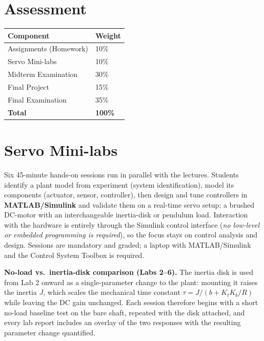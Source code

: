 \documentclass[11pt]{article}
\begin{document}
\section{Assessment}
\begin{center}
\begin{tabular}{@{}L{9cm} C{2cm}@{}}
\toprule
\textbf{Component} & \textbf{Weight} \\
\midrule
Assignments (Homework)      & 10\% \\
Servo Mini-labs             & 10\% \\
Midterm Examination         & 30\% \\
Final Project               & 15\% \\
Final Examination           & 35\% \\
\midrule
\textbf{Total}              & \textbf{100\%} \\
\bottomrule
\end{tabular}
\end{center}

\section{Servo Mini-labs}
Six 45-minute hands-on sessions run in parallel with the lectures. Students identify a
plant model from experiment (system identification), model its components (actuator,
sensor, controller), then design and tune controllers in \textbf{MATLAB/Simulink} and
validate them on a real-time servo setup: a brushed DC-motor with an interchangeable
inertia-disk or pendulum load. Interaction with the hardware is entirely through the
Simulink control interface (\emph{no low-level or embedded programming is required}),
so the focus stays on control analysis and design. Sessions are mandatory and graded;
a laptop with MATLAB/Simulink and the Control System Toolbox is required.

\textbf{No-load vs.\ inertia-disk comparison (Labs 2--6).} The inertia disk is used from
Lab 2 onward as a single-parameter change to the plant: mounting it raises the inertia
$J$, which scales the mechanical time constant $\tau = J/(b + K_tK_b/R)$ while leaving
the DC gain unchanged. Each session therefore begins with a short no-load baseline test
on the bare shaft, repeated with the disk attached, and every lab report includes an
overlay of the two responses with the resulting parameter change quantified.
\end{document}

